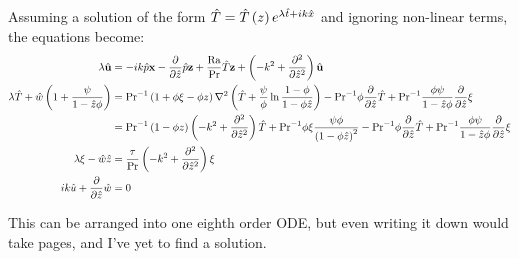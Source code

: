 	Assuming a solution of the form $\hat{T}=\hat{T}\left(z\right)e^{\lambda \hat{t} + i k \hat{x}}$ and ignoring non-linear terms, the equations become:
	\begin{align}
		\lambda\hat{\mathbf{u}}&=-ik\hat{p}\mathbf{x}-\frac{\partial}{\partial \hat{z}}\hat{p}\mathbf{z}+\frac{\mathrm{Ra}}{\mathrm{Pr}}\hat{T}\mathbf{z}+\left(-k^{2}+\frac{\partial^{2}}{\partial \hat{z}^{2}}\right)\hat{\mathbf{u}}\\ 
		\lambda\hat{T}+\hat{w}\left(1 + \frac{\psi}{1-\hat{z}\phi}\right)&=\mathrm{Pr}^{-1}\left(1+\phi\xi-\phi z\right)\nabla^{2}\left(\hat{T}+\frac{\psi}{\phi}\ln{\frac{1-\phi}{1-\phi \hat{z}}}\right)-\mathrm{Pr}^{-1}\phi\frac{\partial}{\partial \hat{z}}\hat{T}+\mathrm{Pr}^{-1}\frac{\phi\psi}{1-\hat{z}\phi}\frac{\partial}{\partial \hat{z}}\xi\\
		&=\mathrm{Pr}^{-1}\left(1-\phi z\right)\left(-k^{2}+\frac{\partial^{2}}{\partial \hat{z}^{2}}\right)\hat{T}+\mathrm{Pr}^{-1}\phi\xi\frac{\psi\phi}{\left(1-\phi \hat{z}\right)^{2}}-\mathrm{Pr}^{-1}\phi\frac{\partial}{\partial \hat{z}}\hat{T}+\mathrm{Pr}^{-1}\frac{\phi\psi}{1-\hat{z}\phi}\frac{\partial}{\partial \hat{z}}\xi\\
		\lambda\xi-\hat{w}\hat{z}&=\frac{\tau}{\mathrm{Pr}}\left(-k^{2}+\frac{\partial^{2}}{\partial \hat{z}^{2}}\right)\xi\\
		ik\hat{u} + \frac{\partial}{\partial \hat{z}}\hat{w}&=0
	\end{align}

	This can be arranged into one eighth order ODE, but even writing it down would take pages, and I've yet to find a solution.

